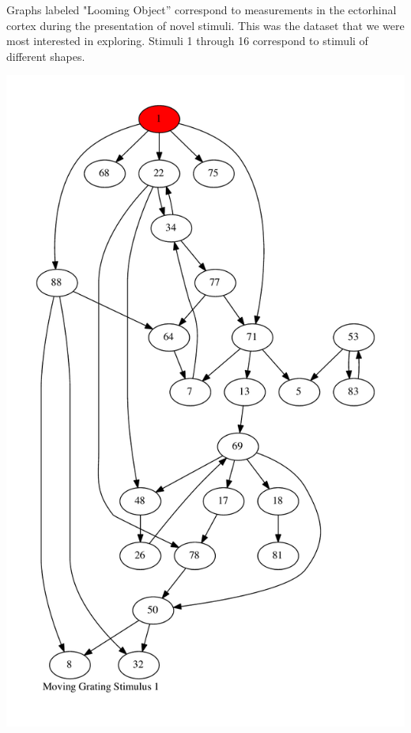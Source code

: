 \documentclass{article}
\begin{document}
Graphs labeled "Looming Object'' correspond to measurements in the ectorhinal 
cortex during the presentation of novel stimuli. This was the dataset that we 
were most interested in exploring. Stimuli 1 through 16 correspond to stimuli  
of different shapes. \par


\newpage
\includegraphics[max height=\textheight,max width=\textwidth]{stim_mov_grat/stim1_pp.pdf}
\end{document}
